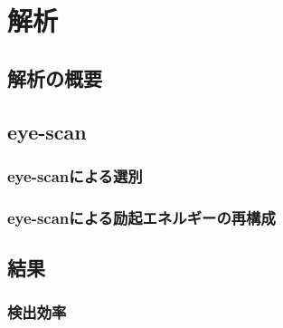 \chapter{解析}
%
%
%
\section{解析の概要}

\section{eye-scan}
\subsection{eye-scanによる選別}
\subsection{eye-scanによる励起エネルギーの再構成}

\section{結果}
\subsection{検出効率}
